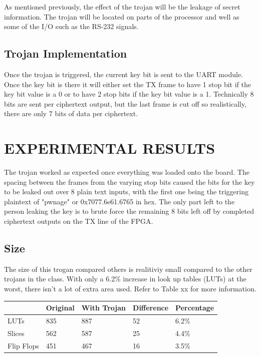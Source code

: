 \documentclass[letterpaper, 10 pt, conference]{ieeeconf}  %
\begin{document}
As mentioned previously, the effect of the trojan will be the leakage of secret information.  The trojan will be located on parts of the processor and well as some of the I/O such as the RS-232 signals.

\subsection{Trojan Implementation}

Once the trojan is triggered, the current key bit is sent to the UART module. Once the key bit is there it will either set the TX frame to have 1 stop bit if the key bit value is a 0 or to have 2 stop bits if the key bit value is a 1. Technically 8 bits are sent per ciphertext output, but the last frame is cut off so realistically, there are only 7 bits of data per ciphertext.
  
\section{EXPERIMENTAL RESULTS}

The trojan worked as expected once everything was loaded onto the board. The spacing between the frames from the varying stop bits caused the bits for the key to be leaked out over 8 plain text inputs, with the first one being the triggering plaintext of "pwnage" or 0x7077.6e61.6765 in hex. The only part left to the person leaking the key is to brute force the remaining 8 bits left off by completed ciphertext outputs on the TX line of the FPGA. 

\subsection{Size}
 
The size of this trogan compared others is realitiviy small compared to the other trojans in the class. With only a 6.2\% increase in look up tables (LUTs) at the worst, there isn't a lot of extra area used. Refer to Table xx for more information.

 \begin{center}
    \begin{tabular}{| l | l | l | l | l |}
        \hline
        & Original & With Trojan & Difference & Percentage \\ \hline
        LUTs & 835 & 887 & 52 & 6.2\% \\ \hline
        Slices & 562 & 587 & 25 & 4.4\% \\ \hline
        Flip Flops & 451 & 467 & 16 & 3.5\% \\
        \hline
    \end{tabular}
\end{center}
\end{document}
